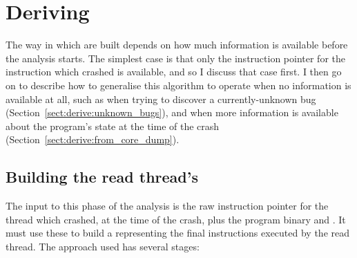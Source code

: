 \section{Deriving \StateMachines}


The way in which {\StateMachines} are built depends on how much
information is available before the analysis starts.  The simplest
case is that only the instruction pointer for the instruction which
crashed is available, and so I discuss that case first.  I then go on
to describe how to generalise this algorithm to operate when no
information is available at all, such as when trying to discover a
currently-unknown bug (Section~\ref{sect:derive:unknown_bugs}), and
when more information is available about the program's state at the
time of the crash (Section~\ref{sect:derive:from_core_dump}).


\subsection{Building the read thread's \StateMachine}

The input to this phase of the analysis is the raw instruction pointer
for the thread which crashed, at the time of the crash, plus the
program binary and .  It must use these to
build a {\StateMachine} representing the final \backref{$\alpha$}
instructions executed by the read thread.  The approach used has
several stages:

